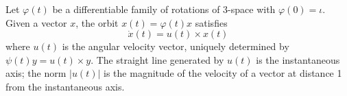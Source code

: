 Let $\varphi(t)$ be a differentiable family of rotations of 3-space with $\varphi(0) = \iota$. Given a vector $x$, the orbit $x(t) = \varphi(t)x$ satisfies
$$\dot{x}(t) = u(t) \times x(t)$$
where $u(t)$ is the angular velocity vector, uniquely determined by $\psi(t) y = u(t) \times y$. The straight line generated by $u(t)$ is the instantaneous axis; the norm $|u(t)|$ is the magnitude of the velocity of a vector at distance 1 from the instantaneous axis.

